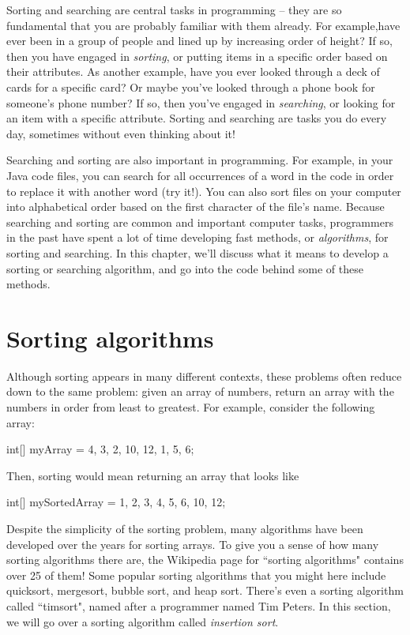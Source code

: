 Sorting and searching are central tasks in programming -- they are so fundamental that you are probably familiar with them already. For example,have ever been in a group of people and lined up by increasing order of height? If so, then you have engaged in \emph{sorting}, or putting items in a specific order based on their attributes. As another example, have you ever looked through a deck of cards for a specific card? Or maybe you've looked through a phone book for someone's phone number? If so, then you've engaged in \emph{searching}, or looking for an item with a specific attribute. 
Sorting and searching are tasks you do every day, sometimes without even thinking about it! 

Searching and sorting are also important in programming. For example, in your Java code files, you can search for all occurrences of a word in the code in order to replace it with another word (try it!). You can also sort files on your computer into alphabetical order based on the first character of the file's name. Because searching and sorting are common and important computer tasks, programmers in the past have spent a lot of time developing fast methods, or \emph{algorithms}, for sorting and searching. In this chapter, we'll discuss what it means to develop a sorting or searching algorithm, and go into the code behind some of these methods.

\section{Sorting algorithms}

Although sorting appears in many different contexts, these problems often reduce down to the same problem: given an array of numbers, return an array with the numbers in order from least to greatest. For example, consider the following  array:
\begin{code}
int[] myArray = {4, 3, 2, 10, 12, 1, 5, 6};
\end{code}
Then, sorting  would mean returning an array  that looks like
\begin{code}
int[] mySortedArray = {1, 2, 3, 4, 5, 6, 10, 12};
\end{code}

Despite the simplicity of the sorting problem, many algorithms have been developed over the years for sorting arrays. To give you a sense of how many sorting algorithms there are, the Wikipedia page for ``sorting algorithms" contains over 25 of them! Some popular sorting algorithms that you might here include quicksort, mergesort, bubble sort, and heap sort. There's even a sorting algorithm called ``timsort", named after a programmer named Tim Peters. In this section, we will go over a sorting algorithm called \emph{insertion sort}.


